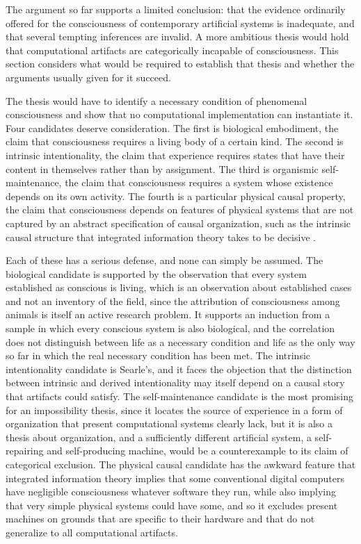 \documentclass[12pt]{article}
\theoremstyle{definition}
\begin{document}
The argument so far supports a limited conclusion: that the evidence ordinarily offered for the consciousness of contemporary artificial systems is inadequate, and that several tempting inferences are invalid. A more ambitious thesis would hold that computational artifacts are categorically incapable of consciousness. This section considers what would be required to establish that thesis and whether the arguments usually given for it succeed.

The thesis would have to identify a necessary condition of phenomenal consciousness and show that no computational implementation can instantiate it. Four candidates deserve consideration. The first is biological embodiment, the claim that consciousness requires a living body of a certain kind. The second is intrinsic intentionality, the claim that experience requires states that have their content in themselves rather than by assignment. The third is organismic self-maintenance, the claim that consciousness requires a system whose existence depends on its own activity. The fourth is a particular physical causal property, the claim that consciousness depends on features of physical systems that are not captured by an abstract specification of causal organization, such as the intrinsic causal structure that integrated information theory takes to be decisive \cite{tononi2016}.

Each of these has a serious defense, and none can simply be assumed. The biological candidate is supported by the observation that every system established as conscious is living, which is an observation about established cases and not an inventory of the field, since the attribution of consciousness among animals is itself an active research problem. It supports an induction from a sample in which every conscious system is also biological, and the correlation does not distinguish between life as a necessary condition and life as the only way so far in which the real necessary condition has been met. The intrinsic intentionality candidate is Searle's, and it faces the objection that the distinction between intrinsic and derived intentionality may itself depend on a causal story that artifacts could satisfy. The self-maintenance candidate is the most promising for an impossibility thesis, since it locates the source of experience in a form of organization that present computational systems clearly lack, but it is also a thesis about organization, and a sufficiently different artificial system, a self-repairing and self-producing machine, would be a counterexample to its claim of categorical exclusion. The physical causal candidate has the awkward feature that integrated information theory implies that some conventional digital computers have negligible consciousness whatever software they run, while also implying that very simple physical systems could have some, and so it excludes present machines on grounds that are specific to their hardware and that do not generalize to all computational artifacts.
\end{document}
